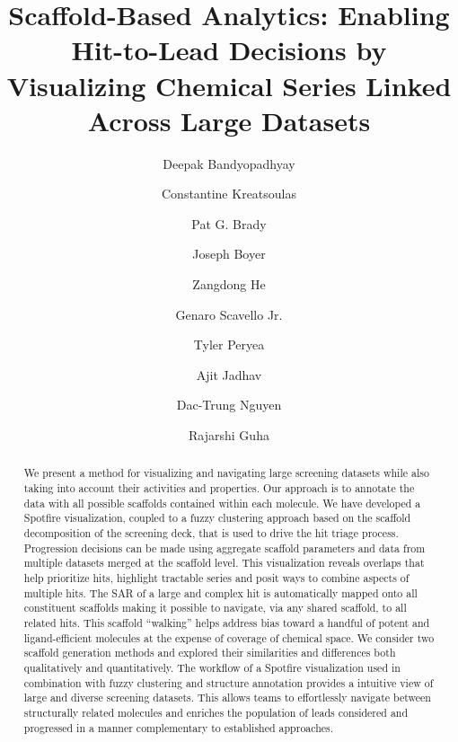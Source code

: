 \documentclass[journal=jacsat,biochem,manuscript=article]{achemso}
\author{Deepak Bandyopadhyay}
\author{Constantine Kreatsoulas}
\author{Pat G. Brady}
\author{Joseph Boyer}
\author{Zangdong He}
\author{Genaro Scavello Jr.}
\affiliation[GSK]{GlaxoSmithKline, 1250 S. Collegeville Rd, Collegeville, PA 19426}
\author{Tyler Peryea}
\author{Ajit Jadhav}
\author{Dac-Trung Nguyen}
\author{Rajarshi Guha}
\affiliation[NCATS]{National Center for Advancing Translational
  Science, 9800 Medical Center Drive, Rockville, MD 20850}
\title[Scaffold Analytics] {Scaffold-Based Analytics: Enabling Hit-to-Lead
  Decisions by Visualizing Chemical Series Linked Across Large Datasets}
\begin{document}






\begin{abstract}
  We present a method for visualizing and navigating large screening
  datasets while also taking into account their activities and properties. Our
  approach is to annotate the data with all possible scaffolds
  contained within each molecule.  We have developed a Spotfire
  visualization, coupled to a fuzzy clustering approach based on the
  scaffold decomposition of the screening deck, that is used to drive
  the hit triage process. Progression decisions can be made using
  aggregate scaffold parameters and data from multiple datasets merged
  at the scaffold level.  This visualization reveals overlaps
  that help prioritize hits, highlight tractable series and posit ways
  to combine aspects of multiple hits.  The SAR of a large and complex
  hit is automatically mapped onto all constituent scaffolds making it
  possible to navigate, via any shared scaffold, to all related hits.
  This scaffold ``walking'' helps address bias toward a handful of
  potent and ligand-efficient molecules at the expense of coverage of
  chemical space.  We consider two scaffold generation methods and
  explored their similarities and differences both qualitatively and
  quantitatively.  The workflow of a Spotfire visualization used in
  combination with fuzzy clustering and structure annotation provides
  a intuitive view of large and diverse screening datasets. This
  allows teams to effortlessly navigate between structurally related
  molecules and enriches the population of leads considered and
  progressed in a manner complementary to established approaches.
\end{abstract}
\end{document}
